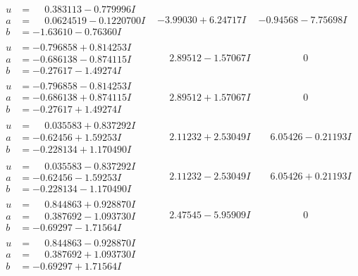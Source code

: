 \documentclass[1p]{elsarticle_modified}
\theoremstyle{definition}
\begin{document}
$$\begin{array}{c|c|c}
\begin{aligned}
u &= \phantom{-}0.383113 - 0.779996 I \\
a &= \phantom{-}0.0624519 - 0.1220700 I \\
b &= -1.63610 - 0.76360 I\end{aligned}
 & -3.99030 + 6.24717 I & -0.94568 - 7.75698 I \\ \hline\begin{aligned}
u &= -0.796858 + 0.814253 I \\
a &= -0.686138 - 0.874115 I \\
b &= -0.27617 - 1.49274 I\end{aligned}
 & \phantom{-}2.89512 - 1.57067 I & \phantom{-0.000000 } 0 \\ \hline\begin{aligned}
u &= -0.796858 - 0.814253 I \\
a &= -0.686138 + 0.874115 I \\
b &= -0.27617 + 1.49274 I\end{aligned}
 & \phantom{-}2.89512 + 1.57067 I & \phantom{-0.000000 } 0 \\ \hline\begin{aligned}
u &= \phantom{-}0.035583 + 0.837292 I \\
a &= -0.62456 + 1.59253 I \\
b &= -0.228134 + 1.170490 I\end{aligned}
 & \phantom{-}2.11232 + 2.53049 I & \phantom{-}6.05426 - 0.21193 I \\ \hline\begin{aligned}
u &= \phantom{-}0.035583 - 0.837292 I \\
a &= -0.62456 - 1.59253 I \\
b &= -0.228134 - 1.170490 I\end{aligned}
 & \phantom{-}2.11232 - 2.53049 I & \phantom{-}6.05426 + 0.21193 I \\ \hline\begin{aligned}
u &= \phantom{-}0.844863 + 0.928870 I \\
a &= \phantom{-}0.387692 - 1.093730 I \\
b &= -0.69297 - 1.71564 I\end{aligned}
 & \phantom{-}2.47545 - 5.95909 I & \phantom{-0.000000 } 0 \\ \hline\begin{aligned}
u &= \phantom{-}0.844863 - 0.928870 I \\
a &= \phantom{-}0.387692 + 1.093730 I \\
b &= -0.69297 + 1.71564 I\end{aligned}

\end{array}$$
\end{document}
